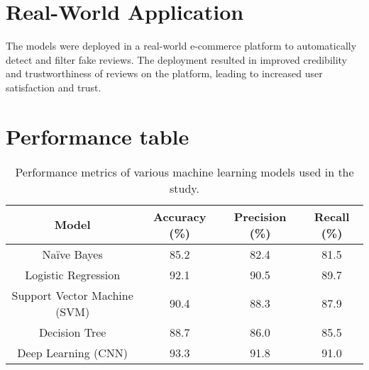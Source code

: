 \section{Real-World Application}
The models were deployed in a real-world e-commerce platform to automatically detect and filter fake reviews. The deployment resulted in improved credibility and trustworthiness of reviews on the platform, leading to increased user satisfaction and trust.
\section{Performance table}
\begin{table}[H]
    \centering
    \begin{tabular}{|c|c|c|c|}
        \hline
        \textbf{Model} & \textbf{Accuracy (\%)} & \textbf{Precision (\%)} & \textbf{Recall (\%)} \\
        \hline
        Naïve Bayes & 85.2 & 82.4 & 81.5 \\
        \hline
        Logistic Regression & 92.1 & 90.5 & 89.7 \\
        \hline
        Support Vector Machine (SVM) & 90.4 & 88.3 & 87.9 \\
        \hline
        Decision Tree & 88.7 & 86.0 & 85.5 \\
        \hline
        Deep Learning (CNN) & 93.3 & 91.8 & 91.0 \\
        \hline
    \end{tabular}
    \caption{Performance metrics of various machine learning models used in the study.}
    \label{table:performance}
\end{table}